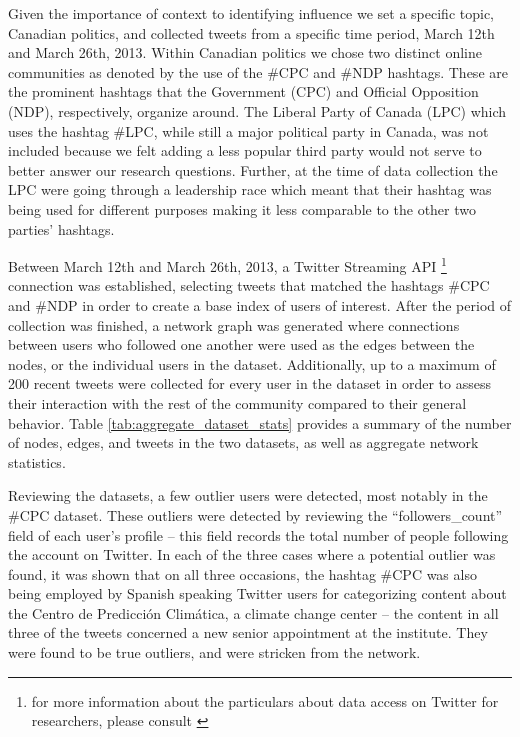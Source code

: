 \documentclass[a4paper,12pt]{article}
\begin{document}
Given the importance of context to identifying influence we set a specific topic, Canadian politics, and collected tweets from a specific time period, March 12th and March 26th, 2013. Within Canadian politics we chose two distinct online communities as denoted by the use of the \#CPC and \#NDP hashtags. These are the prominent hashtags that the Government (CPC) and Official Opposition (NDP), respectively, organize around. The Liberal Party of Canada (LPC) which uses the hashtag \#LPC, while still a major political party in Canada, was not included because we felt adding a less popular third party would not serve to better answer our research questions. Further, at the time of data collection the LPC were going through a leadership race which meant that their hashtag was being used for different purposes making it less comparable to the other two parties' hashtags.

Between March 12th and March 26th, 2013, a Twitter Streaming API \footnote{for more information about the particulars about data access on Twitter for researchers, please consult \cite{gaffneypuschmanntwitterandsociety}} connection was established, selecting tweets that matched the hashtags \#CPC and \#NDP in order to create a base index of users of interest. After the period of collection was finished, a network graph was generated where connections between users who followed one another were used as the edges between the nodes, or the individual users in the dataset. Additionally, up to a maximum of 200 recent tweets were collected for every user in the dataset in order to assess their interaction with the rest of the community compared to their general behavior. Table \ref{tab:aggregate_dataset_stats} provides a summary of the number of nodes, edges, and tweets in the two datasets, as well as aggregate network statistics.

Reviewing the datasets, a few outlier users were detected, most notably in the \#CPC dataset. These outliers were detected by reviewing the ``followers\_count'' field of each user's profile -- this field records the total number of people following the account on Twitter. In each of the three cases where a potential outlier was found, it was shown that on all three occasions, the hashtag \#CPC was also being employed by Spanish speaking Twitter users for categorizing content about the Centro de Predicci\'on Clim\'atica, a climate change center -- the content in all three of the tweets concerned a new senior appointment at the institute. They were found to be true outliers, and were stricken from the network.
\end{document}
